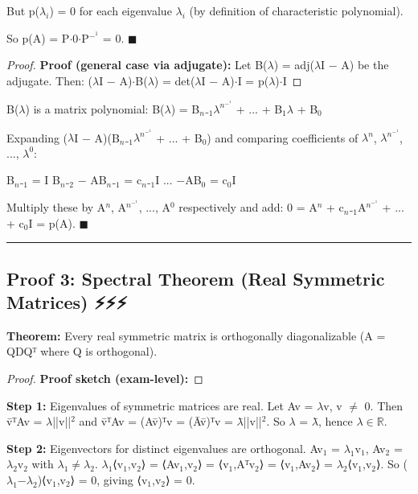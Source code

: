 \documentclass[12pt,a4paper,openany]{book}
\begin{document}
{{But p($\lambda_i$) = 0 for each eigenvalue $\lambda_i$ (by definition of characteristic polynomial).

So p(A) = P$\cdot$0$\cdot$P$^{-}^1$ = 0. $\blacksquare$

\begin{proof}
\textbf{Proof (general case via adjugate):}
Let B($\lambda$) = adj($\lambda$I − A) be the adjugate. Then:
($\lambda$I − A)$\cdot$B($\lambda$) = det($\lambda$I − A)$\cdot$I = p($\lambda$)$\cdot$I
\end{proof}

B($\lambda$) is a matrix polynomial: B($\lambda$) = B$_n$₋$_1\lambda^n^{-}^1$ + ... + B$_1\lambda$ + B$_0$

Expanding ($\lambda$I − A)(B$_n$₋$_1\lambda^n^{-}^1$ + ... + B$_0$) and comparing coefficients of $\lambda^n$, $\lambda^n^{-}^1$, ..., $\lambda^0$:

B$_n$₋$_1$ = I
B$_n$₋$_2$ − AB$_n$₋$_1$ = c$_n$₋$_1$I
...
−AB$_0$ = c$_0$I

Multiply these by A$^n$, A$^n^{-}^1$, ..., A$^0$ respectively and add:
0 = A$^n$ + c$_n$₋$_1$A$^n^{-}^1$ + ... + c$_0$I = p(A). $\blacksquare$

\bigskip\noindent\rule{\textwidth}{0.4pt}\bigskip

\subsection{Proof 3: Spectral Theorem (Real Symmetric Matrices) ⚡⚡⚡}

\begin{tcolorbox}[colback=lightblue,colframe=thmblue,title=\textbf{Theorem},breakable,boxrule=1.5pt]
\textbf{Theorem:} Every real symmetric matrix is orthogonally diagonalizable (A = QDQᵀ where Q is orthogonal).
\end{tcolorbox}

\begin{proof}
\textbf{Proof sketch (exam-level):}
\end{proof}

\textbf{Step 1:} Eigenvalues of symmetric matrices are real.
Let Av = $\lambda$v, v $\neq$ 0. Then v̄ᵀAv = $\lambda$||v||$^2$ and v̄ᵀAv = (Av̄)ᵀv = (Āv̄)ᵀv = $\lambda$̄||v||$^2$.
So $\lambda$ = $\lambda$̄, hence $\lambda\in\mathbb{R}$. 

\textbf{Step 2:} Eigenvectors for distinct eigenvalues are orthogonal.
Av$_1$ = $\lambda_1$v$_1$, Av$_2$ = $\lambda_2$v$_2$ with $\lambda_1\neq\lambda_2$.
$\lambda_1$⟨v$_1$,v$_2$⟩ = ⟨Av$_1$,v$_2$⟩ = ⟨v$_1$,Aᵀv$_2$⟩ = ⟨v$_1$,Av$_2$⟩ = $\lambda_2$⟨v$_1$,v$_2$⟩.
So ($\lambda_1$−$\lambda_2$)⟨v$_1$,v$_2$⟩ = 0, giving ⟨v$_1$,v$_2$⟩ = 0. 

}}
\end{document}
